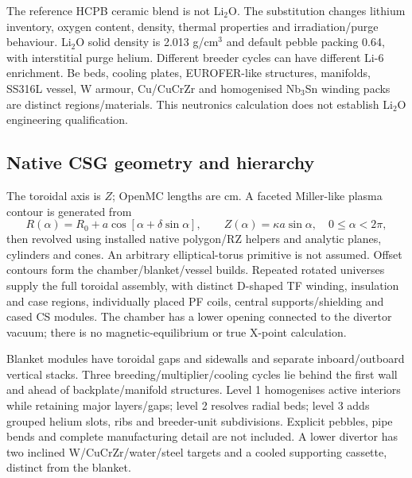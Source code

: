 The reference HCPB ceramic blend is not Li$_2$O. The substitution changes lithium inventory, oxygen content, density, thermal properties and irradiation/purge behaviour. Li$_2$O solid density is 2.013 g/cm$^3$ and default pebble packing 0.64, with interstitial purge helium. Different breeder cycles can have different Li-6 enrichment. Be beds, cooling plates, EUROFER-like structures, manifolds, SS316L vessel, W armour, Cu/CuCrZr and homogenised Nb$_3$Sn winding packs are distinct regions/materials. This neutronics calculation does not establish Li$_2$O engineering qualification.

\subsection{Native CSG geometry and hierarchy}
The toroidal axis is $Z$; OpenMC lengths are cm. A faceted Miller-like plasma contour is generated from
\begin{equation}
R(\alpha)=R_0+a\cos[\alpha+\delta\sin\alpha],\qquad
Z(\alpha)=\kappa a\sin\alpha,\quad 0\le\alpha<2\pi,
\end{equation}
then revolved using installed native polygon/RZ helpers and analytic planes, cylinders and cones. An arbitrary elliptical-torus primitive is not assumed. Offset contours form the chamber/blanket/vessel builds. Repeated rotated universes supply the full toroidal assembly, with distinct D-shaped TF winding, insulation and case regions, individually placed PF coils, central supports/shielding and cased CS modules. The chamber has a lower opening connected to the divertor vacuum; there is no magnetic-equilibrium or true X-point calculation.

Blanket modules have toroidal gaps and sidewalls and separate inboard/outboard vertical stacks. Three breeding/multiplier/cooling cycles lie behind the first wall and ahead of backplate/manifold structures. Level 1 homogenises active interiors while retaining major layers/gaps; level 2 resolves radial beds; level 3 adds grouped helium slots, ribs and breeder-unit subdivisions. Explicit pebbles, pipe bends and complete manufacturing detail are not included. A lower divertor has two inclined W/CuCrZr/water/steel targets and a cooled supporting cassette, distinct from the blanket.

